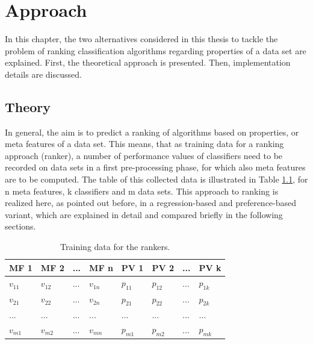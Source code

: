 %
\chapter{Approach}
\label{sec:approach}

In this chapter, the two alternatives considered in this thesis to tackle the problem of ranking classification algorithms regarding properties of a data set are explained. First, the theoretical approach is presented. Then, implementation details are discussed.

\section{Theory}

In general, the aim is to predict a ranking of algorithms based on properties, or meta features of a data set. This means, that as training data for a ranking approach (ranker), a number of performance values of classifiers need to be recorded on data sets in a first pre-processing phase, for which also meta features are to be computed. The table of this collected data is illustrated in Table \ref{tab:performanceValues}, for n meta features, k classifiers and m data sets. This approach to ranking is realized here, as pointed out before, in a regression-based and preference-based variant, which are explained in detail and compared briefly in the following sections.

\begin{table}[h]
\centering
	\begin{tabularx}{\textwidth}{X | X | X | X | X | X | X | X}
		MF 1			& MF 2		& ... 	& MF n		& PV 1 		& PV 2 		&	...	&	PV k 		\\ \hline
		$v_{11}$		& $v_{12}$	& ...	& $v_{1n}$	& $p_{11}$	& $p_{12}$	& 	...	&	$p_{1k}$		\\ 
		$v_{21}$		& $v_{22}$	& ...	& $v_{2n}$	& $p_{21}$	& $p_{22}$	& 	...	&	$p_{2k}$		\\ 
		...			& ...		& ...	& ...		& ...		& ...		&	...	&	...			\\ 
		$v_{m1}$		& $v_{m2}$	& ... 	& $v_{mn}$	& $p_{m1}$	& $p_{m2}$	& 	...	&	$p_{mk}$			 
	\end{tabularx}
	\caption{Training data for the rankers.}
	\label{tab:performanceValues}
\end{table}

